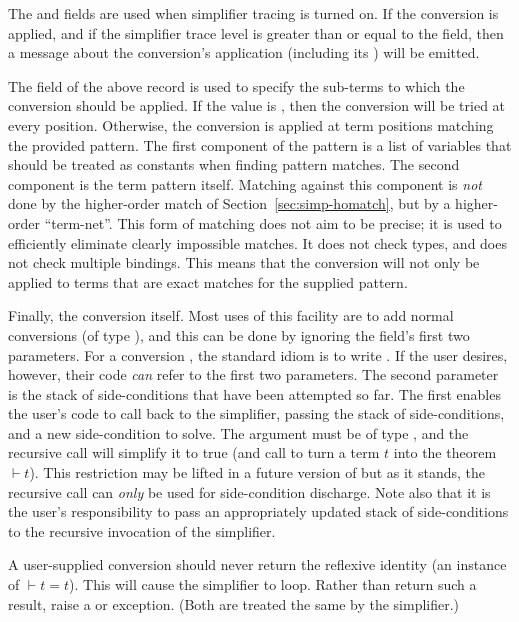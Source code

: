 The  and  fields are used when simplifier tracing
is turned on.  If the conversion is applied, and if the simplifier
trace level is greater than or equal to the  field, then a
message about the conversion's application (including its )
will be emitted.

The  field of the above record is used to specify the
sub-terms to which the conversion should be applied.  If the value is
, then the conversion will be tried at every position.
Otherwise, the conversion is applied at term positions matching the
provided pattern.  The first component of the pattern is a list of
variables that should be treated as constants when finding pattern
matches.  The second component is the term pattern itself.  Matching
against this component is \emph{not} done by the higher-order match of
Section~\ref{sec:simp-homatch}, but by a higher-order ``term-net''.
This form of matching does not aim to be precise; it is used to
efficiently eliminate clearly impossible matches.  It does not check
types, and does not check multiple bindings.  This means that the
conversion will not only be applied to terms that are exact matches
for the supplied pattern.

Finally, the conversion itself.  Most uses of this facility are to add
normal \HOL{} conversions (of type ), and this can be
done by ignoring the  field's first two parameters.  For a
conversion , the standard idiom is to write
.  If the user desires, however, their code
\emph{can} refer to the first two parameters.  The second parameter is
the stack of side-conditions that have been attempted so far.  The
first enables the user's code to call back to the simplifier, passing
the stack of side-conditions, and a new side-condition to solve.  The
 argument must be of type , and the recursive
call will simplify it to true (and call  to turn a term
$t$ into the theorem $\vdash t$).  This restriction may be lifted in a
future version of \HOL{} but as it stands, the recursive call can
\emph{only} be used for side-condition discharge.  Note also that it
is the user's responsibility to pass an appropriately updated stack of
side-conditions to the recursive invocation of the simplifier.

A user-supplied conversion should never return the reflexive identity
(an instance of $\vdash t = t$).  This will cause the simplifier to
loop.  Rather than return such a result, raise a  or
 exception.  (Both are treated the same by the simplifier.)

